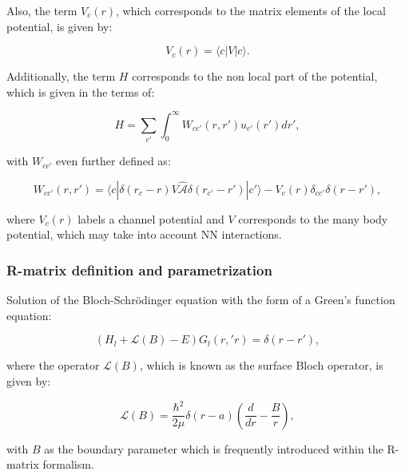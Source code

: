 \documentclass[openany]{book}
\begin{document}
Also, the term $V_c(r)$, which corresponds to the matrix elements of the local potential, is given by:

\begin{equation}\label{rmatrix_channels_V}
	V_c(r) = \langle c | V | c \rangle. 
\end{equation}

Additionally, the term $H$ corresponds to the non local part of the potential, which is given in the terms of:

\begin{equation}\label{rmatrix_channels_nonLocal}
	H = \sum_{c'}{\int_{0}^{\infty} W_{cc'}(r, r')u_{c'}(r') dr'},
\end{equation}

with $W_{cc'}$ even further defined as: 

\begin{equation}\label{rmatrix_channels_nonLocal_W}
	W_{cc'}(r, r') = \langle c | \delta (r_c - r) V \hat{\mathcal{A}} \delta (r_{c'} - r')|  c' \rangle - V_c(r)\delta_{cc'}\delta (r- r'),
\end{equation}

where $V_c(r)$ labels a channel potential and $V$ corresponds to the many body potential, which may take into account NN interactions. \\

\subsubsection{R-matrix definition and parametrization} \label{ssub:rmatrix_calculable_definition_parametrization}


Solution of the Bloch-Schrödinger equation with the form of a Green's function equation:

\begin{equation}\label{rmatrix_BlochSchrodinger}
	(H_l + \mathcal{L}(B) - E)G_l(r, 'r) = \delta(r - r'),
\end{equation}

where the operator $\mathcal{L}(B)$, which is known as the surface Bloch operator,  is given by:

\begin{equation}\label{rmatrix_Bloch_operator}
	\mathcal{L}(B) = \frac{\hbar^2}{2\mu} \delta(r - a) \left(\frac{d}{dr} - \frac{B}{r}\right),
\end{equation} 

with $B$ as the boundary parameter which is frequently introduced within the R-matrix formalism. \\
\end{document}

